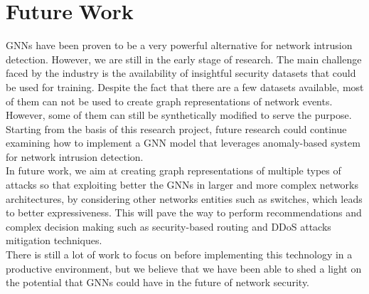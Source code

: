\section{Future\textcolor{white}{.}Work}
GNNs have been proven to be a very powerful alternative for network intrusion
detection. However, we are still in the early stage of research. The main
challenge faced by the industry is the availability of insightful security datasets
that could be used for training. Despite the fact that there are a few datasets
available, most of them can not be used to create graph representations of
network events. However, some of them can still be synthetically modified to
serve the purpose.
Starting from the basis of this research project, future research could continue examining how to implement a GNN model  that leverages anomaly-based system for network intrusion detection. \\
In future work, we aim at creating graph representations of multiple types of attacks so that exploiting better the GNNs in larger and more complex networks architectures, by considering other networks entities such as switches, which leads to better expressiveness. This will pave the way to perform recommendations and complex decision making such as security-based routing and DDoS attacks mitigation techniques. \\  
There is still a lot of work to focus on before implementing this technology in a
productive environment, but we believe that we have been able to shed a light on
the potential that GNNs could have in the future of network security.\\
%
